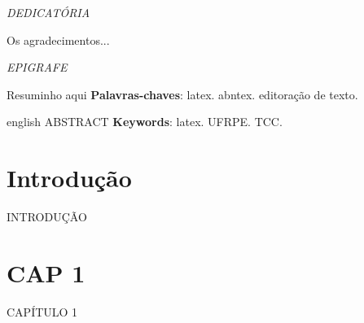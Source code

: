 \documentclass[a4paper, twoside, english, brazil, 12pt]{abntex2}
\begin{document}
\begin{dedicatoria}
	\vspace*{\fill}
	\begin{center}
		\textit{DEDICATÓRIA}
	\end{center}
	\vspace*{\fill}
\end{dedicatoria}

\begin{agradecimentos}
	Os agradecimentos...
\end{agradecimentos}

\begin{epigrafe}
	\vspace*{\fill}
	\begin{flushright}
		\textit{EPIGRAFE}
	\end{flushright}
\end{epigrafe}

\begin{resumo}
	Resuminho aqui
	\vspace{\onelineskip}
	\noindent
	\textbf{Palavras-chaves}: latex. abntex. editoração de texto.
\end{resumo}


\renewcommand{\resumoname}{Abstract}
\begin{resumoumacoluna}
	\begin{otherlanguage*}{english}
		ABSTRACT
		\vspace{\onelineskip}
		\noindent
		\textbf{Keywords}: latex. UFRPE. TCC.
	\end{otherlanguage*}
\end{resumoumacoluna}

\listoffigures*
\cleardoublepage

\tableofcontents*
\cleardoublepage

\textual
\chapter*[Introdução]{Introdução}
INTRODUÇÃO
\chapter{CAP 1}
CAPÍTULO 1

\postextual

\end{document}
